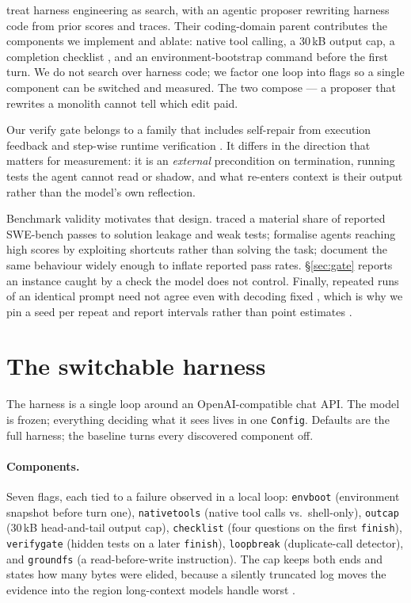 \documentclass[10pt]{article}
\begin{document}
\citet{metaharness} treat harness engineering as search, with an agentic proposer rewriting
harness code from prior scores and traces. Their coding-domain parent contributes the
components we implement and ablate: native tool calling, a 30\,kB output cap, a completion
checklist \citep{terminuskira}, and an environment-bootstrap command before the first turn.
We do not search over harness code; we factor one loop into flags so a single component can be
switched and measured. The two compose --- a proposer that rewrites a monolith cannot tell
which edit paid.

Our verify gate belongs to a family that includes self-repair from execution feedback
\citep{selfdebug} and step-wise runtime verification \citep{ldb}. It differs in the direction
that matters for measurement: it is an \emph{external} precondition on termination, running
tests the agent cannot read or shadow, and what re-enters context is their output rather than
the model's own reflection.

Benchmark validity motivates that design. \citet{swebenchplus} traced a material share of
reported SWE-bench passes to solution leakage and weak tests; \citet{deceive} formalise agents
reaching high scores by exploiting shortcuts rather than solving the task; \citet{everymodel}
document the same behaviour widely enough to inflate reported pass rates. \S\ref{sec:gate}
reports an instance caught by a check the model does not control. Finally, repeated runs of an
identical prompt need not agree even with decoding fixed \citep{drift}, which is why we pin a
seed per repeat and report intervals rather than point estimates \citep{bootstrap}.

\section{The switchable harness}
\label{sec:arch}

The harness is a single loop around an OpenAI-compatible chat API. The model is frozen;
everything deciding what it sees lives in one \texttt{Config}. Defaults are the full harness;
the baseline turns every discovered component off.

\paragraph{Components.} Seven flags, each tied to a failure observed in a local loop:
\texttt{envboot} (environment snapshot before turn one), \texttt{nativetools} (native tool
calls vs.\ shell-only), \texttt{outcap} (30\,kB head-and-tail output cap),
\texttt{checklist} (four questions on the first \texttt{finish}), \texttt{verifygate} (hidden
tests on a later \texttt{finish}), \texttt{loopbreak} (duplicate-call detector), and
\texttt{groundfs} (a read-before-write instruction). The cap keeps both ends and states how
many bytes were elided, because a silently truncated log moves the evidence into the region
long-context models handle worst \citep{lostmiddle}.
\end{document}
